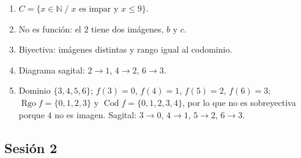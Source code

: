 \documentclass[12pt, letterpaper]{article}
\newcommand{\N}{\mathbb{N}}
\begin{document}
\begin{enumerate}[leftmargin=*, label=\textbf{\arabic*.}]
  \item $C=\{x\in\N \;/\; x \text{ es impar y } x\le 9\}$.
  \item No es función: el $2$ tiene dos imágenes, $b$ y $c$.
  \item Biyectiva: imágenes distintas y rango igual al codominio.
  \item Diagrama sagital: $2\to1$, $4\to2$, $6\to3$.
  \item Dominio $\{3,4,5,6\}$; $f(3)=0$, $f(4)=1$, $f(5)=2$, $f(6)=3$; $\operatorname{Rgo} f=\{0,1,2,3\}$ y $\operatorname{Cod} f=\{0,1,2,3,4\}$, por lo que no es sobreyectiva porque $4$ no es imagen. Sagital: $3\to0$, $4\to1$, $5\to2$, $6\to3$.
\end{enumerate}

\subsection*{Sesión 2}
\end{document}
